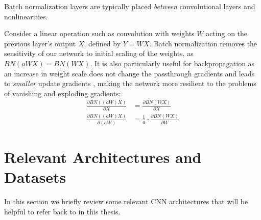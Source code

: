 Batch normalization layers are typically placed \emph{between} convolutional layers
and nonlinearities. 

Consider a linear operation such as convolution with weights $W$ acting on the
previous layer's output $X$, defined by $Y = WX$.
Batch normalization 
removes the sensitivity of our network to
initial scaling of the weights, as 
$BN(aWX) = BN(WX)$.  
It is also particularly useful for backpropagation as an increase in weight
scale does not change the passthrough gradients and leads to \emph{smaller}
update gradients \cite{ioffe_batch_2015}, making the network more resilient to
the problems of vanishing and exploding gradients:
\begin{align}
  \frac{\partial BN((aW)X)}{\partial X} & =  \frac{\partial
  BN(WX)}{\partial X} \nonumber\\
  \frac{\partial BN((aW)X)}{\partial (aW)} & =  \frac{1}{a} \cdot \frac{\partial
  BN(WX)}{\partial W} 
\end{align}

\section{Relevant Architectures and Datasets}
In this section we briefly review some relevant CNN architectures that will be
helpful to refer back to in this thesis. 

